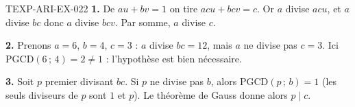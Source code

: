 \begin{corrige}{TEXP-ARI-EX-022}
\textbf{1.} De $au+bv=1$ on tire $acu+bcv=c$. Or $a$ divise $acu$, et $a$
divise $bc$ donc $a$ divise $bcv$. Par somme, $a$ divise $c$.

\textbf{2.} Prenons $a=6$, $b=4$, $c=3$ : $a$ divise $bc=12$, mais $a$ ne
divise pas $c=3$. Ici $\mathrm{PGCD}(6\,;\,4)=2\neq1$ : l'hypothèse est bien
nécessaire.

\textbf{3.} Soit $p$ premier divisant $bc$. Si $p$ ne divise pas $b$, alors
$\mathrm{PGCD}(p\,;\,b)=1$ (les seuls diviseurs de $p$ sont $1$ et $p$). Le
théorème de Gauss donne alors $p\mid c$.
\end{corrige}
